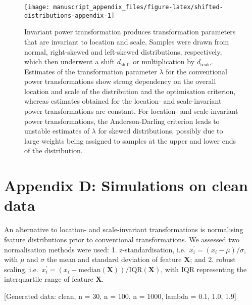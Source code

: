 \documentclass[
  a4paper,
]{article}
\begin{document}
\begin{figure}

{\centering \texttt{[image: manuscript\_appendix\_files/figure-latex/shifted-distributions-appendix-1]} 

}

\caption{Invariant power transformation produces transformation parameters that are invariant to location and scale. Samples were drawn from normal, right-skewed and left-skewed distributions, respectively, which then underwent a shift $d_{\text{shift}}$ or multiplication by $d_{\text{scale}}$. Estimates of the transformation parameter $\lambda$ for the conventional power transformations show strong dependency on the overall location and scale of the distribution and the optimisation criterion, whereas estimates obtained for the location- and scale-invariant power transformations are constant. For location- and scale-invariant power transformations, the Anderson-Darling criterion leads to unstable estimates of $\lambda$ for skewed distributions, possibly due to large weights being assigned to samples at the upper and lower ends of the distribution.}\label{fig:shifted-distributions-appendix}
\end{figure}

\section{Appendix D: Simulations on clean
data}\label{appendix-d-simulations-on-clean-data}

An alternative to location- and scale-invariant transformations is
normalising feature distributions prior to conventional transformations.
We assessed two normalisation methods were used: 1. z-standardisation,
i.e.~\(x^{\prime}_{i} = \left(x_i - \mu \right) / \sigma\), with \(\mu\)
and \(\sigma\) the mean and standard deviation of feature
\(\mathbf{X}\); and 2. robust scaling,
i.e.~\(x^{\prime}_{i} = \left(x_i - \text{median}\left(\mathbf{X}\right) \right) / \text{IQR}\left(\mathbf{X}\right)\),
with \(\text{IQR}\) representing the interquartile range of feature
\(\mathbf{X}\).

{[}Generated data: clean, n = 30, n = 100, n = 1000, lambda = 0.1, 1.0,
1.9{]}
\end{document}
